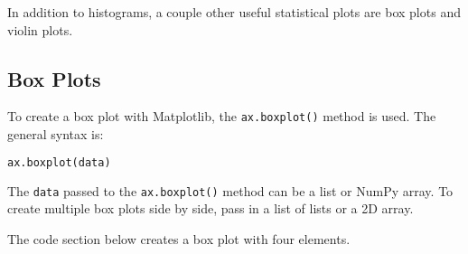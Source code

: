 \documentclass{book}
\newcommand{\passthrough}[1]{#1}
\begin{document}
    
        In addition to histograms, a couple other useful statistical plots are
box plots and violin plots.
    




    
        \hypertarget{box-plots}{%
\subsection{Box Plots}\label{box-plots}}
    




    
        To create a box plot with Matplotlib, the
\passthrough{\lstinline!ax.boxplot()!} method is used. The general
syntax is:

\begin{lstlisting}[language=Python]
ax.boxplot(data)
\end{lstlisting}

The \passthrough{\lstinline!data!} passed to the
\passthrough{\lstinline!ax.boxplot()!} method can be a list or NumPy
array. To create multiple box plots side by side, pass in a list of
lists or a 2D array.

The code section below creates a box plot with four elements.
    
\end{document}
